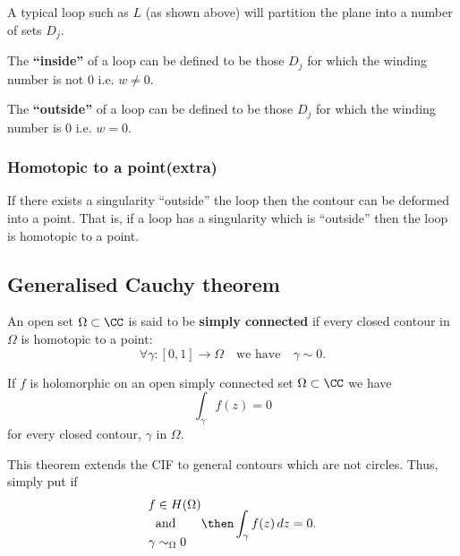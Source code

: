 \documentclass[12pt, a4paper]{article}
\begin{document}
A typical loop such as \(L\) (as shown above) will partition the plane into a number of sets \(D_j\).

\begin{definition}
    The \textbf{``inside''} of a loop can be defined to be those \(D_j\) for which the winding number is not \(0\) i.e. \(w \neq 0\).
\end{definition}


\begin{definition}
    The \textbf{``outside''} of a loop can be defined to be those \(D_j\) for which the winding number is \(0\) i.e. \(w =0\).
\end{definition}

\subsubsection{Homotopic to a point(extra)}

\begin{mdthm}
    If there exists a singularity ``outside'' the loop then the contour can be deformed into a point. That is, if a loop has a singularity which is ``outside'' then the loop is homotopic to a point.
\end{mdthm}

\subsection{Generalised Cauchy theorem}

\begin{definition}
    An open set \(\Omega \subset \CC\) is said to be \textbf{simply connected} if every closed contour in \(\Omega\) is homotopic to a point:
    \[\forall \gamma:[0,1] \to \Omega \quad \text{we have} \quad \gamma \sim 0.\]
\end{definition}

\begin{mdthm}
    If \(f\) is holomorphic on an open simply connected set \(\Omega \subset \CC\) we have 
    \[\int_{\gamma} f(z) = 0\]
    for every closed contour, \(\gamma\) in \(\Omega\).
\end{mdthm}

\begin{mdnote}
    This theorem extends the CIF to general contours which are not circles. Thus, simply put if 
    \[\begin{aligned}
        f &\in H(\Omega) \\
        &\text{and} \\
        \gamma &\sim_{\Omega} 0
    \end{aligned}\then \int_{\gamma} f(z) \, dz =0.\]
\end{mdnote}
\end{document}

